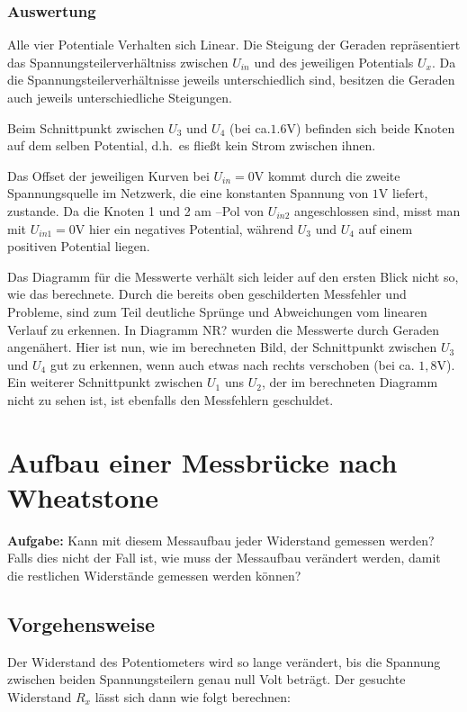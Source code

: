 \documentclass[10pt]{report}
\begin{document}
        \subsubsection{Auswertung}
        Alle vier Potentiale Verhalten sich Linear. Die Steigung der Geraden
        repräsentiert das Spannungsteilerverhältniss zwischen $U_{in}$ und des
        jeweiligen Potentials $U_x$. Da die Spannungsteilerverhältnisse jeweils
		unterschiedlich sind, besitzen die Geraden auch jeweils unterschiedliche
		Steigungen.

        Beim Schnittpunkt zwischen $U_3$ und $U_4$ (bei ca.$1.6$V) befinden sich
        beide Knoten auf dem selben Potential, d.h.\ es fließt kein Strom zwischen
        ihnen.

        Das Offset der jeweiligen Kurven bei $U_{in} = 0$V kommt durch die zweite
        Spannungsquelle im Netzwerk, die eine konstanten Spannung von $1$V liefert,
        zustande. Da die Knoten 1 und 2 am –Pol von $U_{in2}$ angeschlossen sind, misst 
		man mit $U_{in1} = 0$V hier ein negatives Potential, während $U_3$ und $U_4$ auf
		einem positiven Potential liegen.

        \vspace{0.5cm}

        Das Diagramm für die Messwerte verhält sich leider auf den ersten Blick nicht so,
		wie das berechnete. Durch die bereits oben geschilderten Messfehler und Probleme,
		sind zum Teil deutliche Sprünge und Abweichungen vom linearen Verlauf zu erkennen.
		In Diagramm NR? wurden die Messwerte durch Geraden angenähert. Hier ist nun, wie
		im berechneten Bild, der Schnittpunkt zwischen $U_3$ und $U_4$ gut zu erkennen, wenn auch
		etwas nach rechts verschoben (bei ca. $1,8$V). Ein weiterer  Schnittpunkt zwischen $U_1$
		uns $U_2$, der im berechneten Diagramm nicht zu sehen ist, ist ebenfalls den Messfehlern
		geschuldet.


        \section{Aufbau einer Messbrücke nach Wheatstone}
        \textbf{Aufgabe:} Kann mit diesem Messaufbau jeder Widerstand gemessen werden? Falls dies nicht der
        Fall ist, wie muss der Messaufbau verändert werden, damit die restlichen Widerstände
        gemessen werden können?

        \subsection{Vorgehensweise}
        Der Widerstand des Potentiometers wird so lange verändert, bis die Spannung
        zwischen beiden Spannungsteilern genau null Volt beträgt. Der gesuchte
        Widerstand $R_x$ lässt sich dann wie folgt berechnen:
\end{document}

